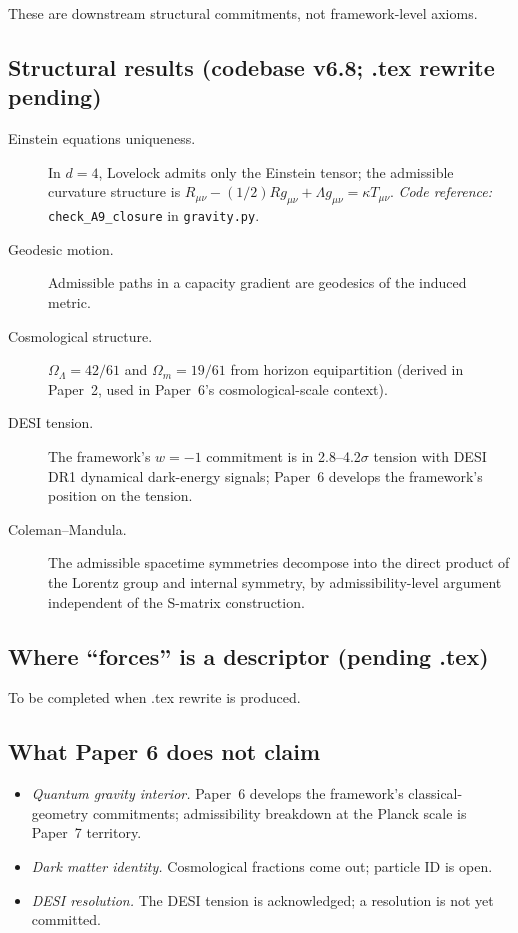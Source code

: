 \documentclass[11pt]{article}
\newcommand{\coderef}[2]{\smallskip\noindent\textit{Code reference:} \texttt{#1} in \texttt{#2}.}
\begin{document}
\noindent These are downstream structural commitments, not framework-level axioms.

\subsection{Structural results (codebase v6.8; .tex rewrite pending)}\label{sec:P6_results}

\begin{description}
    \item[Einstein equations uniqueness.] In $d=4$, Lovelock admits only the Einstein tensor; the admissible curvature structure is $R_{\mu\nu} - (1/2) R g_{\mu\nu} + \Lambda g_{\mu\nu} = \kappa T_{\mu\nu}$. \coderef{check\_A9\_closure}{gravity.py}
    \item[Geodesic motion.] Admissible paths in a capacity gradient are geodesics of the induced metric.
    \item[Cosmological structure.] $\Omega_\Lambda = 42/61$ and $\Omega_m = 19/61$ from horizon equipartition (derived in Paper~2, used in Paper~6's cosmological-scale context).
    \item[DESI tension.] The framework's $w = -1$ commitment is in 2.8--4.2$\sigma$ tension with DESI DR1 dynamical dark-energy signals; Paper~6 develops the framework's position on the tension.
    \item[Coleman--Mandula.] The admissible spacetime symmetries decompose into the direct product of the Lorentz group and internal symmetry, by admissibility-level argument independent of the S-matrix construction.
\end{description}

\subsection{Where ``forces'' is a descriptor (pending .tex)}\label{sec:P6_forces}

To be completed when .tex rewrite is produced.

\subsection{What Paper 6 does not claim}\label{sec:P6_does_not_claim}

\begin{itemize}
    \item \emph{Quantum gravity interior.} Paper~6 develops the framework's classical-geometry commitments; admissibility breakdown at the Planck scale is Paper~7 territory.
    \item \emph{Dark matter identity.} Cosmological fractions come out; particle ID is open.
    \item \emph{DESI resolution.} The DESI tension is acknowledged; a resolution is not yet committed.
\end{itemize}
\end{document}
